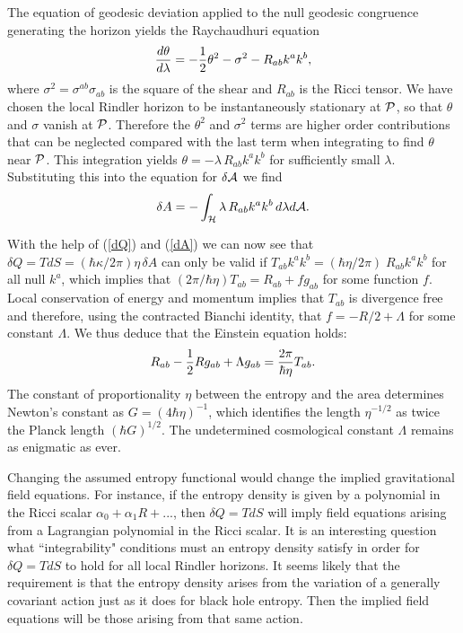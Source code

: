 The equation of geodesic deviation applied to the null geodesic
congruence generating the horizon yields the Raychaudhuri equation
\begin{equation}
{d\theta\over d\lambda}=-{1\over2}\theta^2-\sigma^2-R_{ab}k^ak^b,
\end{equation}
where $\sigma^2=\sigma^{ab}\sigma_{ab}$ is the square of the
shear and $R_{ab}$ is the Ricci tensor.
We have chosen the local Rindler horizon to be instantaneously
stationary at ${\cal P}$,
so that $\theta$ and $\sigma$ vanish at ${\cal P}$. Therefore
the $\theta^2$ and $\sigma^2$ terms are higher order contributions
that can be neglected compared with the last term when integrating to
find $\theta$ near ${\cal P}$. This integration yields
$\theta=-\lambda\, R_{ab} k^a k^b $ for sufficiently
small $\lambda$. Substituting this into the equation
for $\delta {\cal A}$ we find
\begin{equation}
\delta A=-\int_{\cal H} \lambda \, R_{ab}k^a k^b \, d\lambda d{\cal A} .
\label{dA}
\end{equation}

With the help of (\ref{dQ})  and (\ref{dA}) we can now see that
$\delta Q=TdS=(\hbar\kappa/2\pi)\eta\, \delta A $ can only be valid if
$T_{ab}k^ak^b=(\hbar\eta/2\pi)\; R_{ab} k^ak^b$
for all null $k^a$, which implies that
$(2\pi/\hbar\eta)T_{ab}= R_{ab} + f g_{ab}$
for some function $f$.
Local conservation of energy and momentum implies that
$T_{ab}$ is divergence free and therefore, using the contracted
Bianchi identity, that
 $f=-R/2 +\Lambda$ for some
constant $\Lambda$. We thus deduce that the Einstein equation
holds:
\begin{equation}R_{ab}-{1\over 2}R g_{ab}+\Lambda g_{ab}=
{2\pi\over\hbar\eta}T_{ab}.
\end{equation}
The constant of proportionality $\eta$
between the entropy and the area
determines Newton's constant as $G=(4\hbar\eta)^{-1}$,
which identifies the length $\eta^{-1/2}$ as twice
the Planck length $(\hbar G)^{1/2}$. The undetermined
cosmological constant
$\Lambda$ remains as enigmatic as ever.

Changing the assumed entropy functional would change the implied
gravitational field equations. For instance, if the entropy density
is given by a polynomial in the Ricci scalar
$\alpha_0+\alpha_1 R+...$, then $\delta Q=TdS$ will imply
field equations arising from a Lagrangian polynomial in the
Ricci scalar\cite{poly}. It is an interesting question
what ``integrability" conditions must an entropy density satisfy
in order for $\delta Q=TdS$ to hold for all local Rindler horizons.
It seems likely that the requirement is that the entropy density
arises from the variation of a generally covariant action just as it
does for black hole entropy. Then the implied field equations will
be those arising from that same action.


